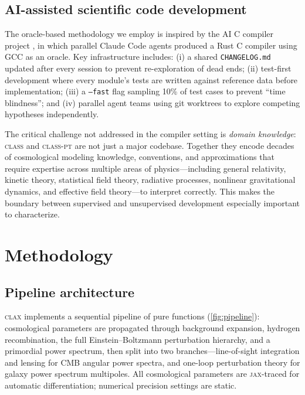 \documentclass{article}
\newcommand{\clax}{\textsc{clax}\xspace}
\newcommand{\class}{\textsc{class}\xspace}
\newcommand{\classpt}{\textsc{class-pt}\xspace}
\newcommand{\jax}{\textsc{jax}\xspace}
\begin{document}
\subsection{AI-assisted scientific code development}

The oracle-based methodology we employ is inspired by the AI C compiler project \citep{carlini2026}, in which parallel Claude Code agents produced a Rust C compiler using GCC as an oracle.
Key infrastructure includes: (i) a shared \texttt{CHANGELOG.md} updated after every session to prevent re-exploration of dead ends; (ii) test-first development where every module's tests are written against reference data before implementation; (iii) a \texttt{--fast} flag sampling 10\% of test cases to prevent ``time blindness''; and (iv) parallel agent teams using git worktrees to explore competing hypotheses independently.

The critical challenge not addressed in the compiler setting is \emph{domain knowledge}: \class and \classpt are not just a major codebase. Together they encode decades of cosmological modeling knowledge, conventions, and approximations that require expertise across multiple areas of physics---including general relativity, kinetic theory, statistical field theory, radiative processes, nonlinear gravitational dynamics, and effective field theory---to interpret correctly.
This makes the boundary between supervised and unsupervised development especially important to characterize.

\section{Methodology}
\label{sec:methods}

\subsection{Pipeline architecture}

\clax implements a sequential pipeline of pure functions (\cref{fig:pipeline}): cosmological parameters are propagated through background expansion, hydrogen recombination, the full Einstein--Boltzmann perturbation hierarchy, and a primordial power spectrum, then split into two branches---line-of-sight integration and lensing for CMB angular power spectra, and one-loop perturbation theory for galaxy power spectrum multipoles.
All cosmological parameters are \jax-traced for automatic differentiation; numerical precision settings are static.
\end{document}
